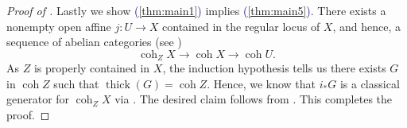 \documentclass[11pt]{amsart}
\def\eqref#1{\textcolor{darkblue}{(\ref{#1})}}
\theoremstyle{plain}
\theoremstyle{definition}
\numberwithin{equation}{section}
\numberwithin{theorem}{section}
\begin{document}
\begin{proof}[Proof of ]
    Lastly we show \eqref{thm:main1} implies \eqref{thm:main5}. There exists a nonempty open affine $j \colon U \to X$ contained in the regular locus of $X$, and hence, a sequence of abelian categories (see \cite[Remark 4.5]{Elagin/Lunts/Schnurer:2020})
    \begin{displaymath}
        \operatorname{coh}_Z X \to \operatorname{coh}X \to \operatorname{coh}U.
    \end{displaymath}
    As $Z$ is properly contained in $X$, the induction hypothesis tells us there exists $G$ in $\operatorname{coh}Z$ such that $\operatorname{thick}(G)=\operatorname{coh}Z$. Hence, we know that $i_\ast G$ is a classical generator for $\operatorname{coh}_Z X$ via . The desired claim follows from . This completes the proof.
    
    




\end{proof}
\end{document}
